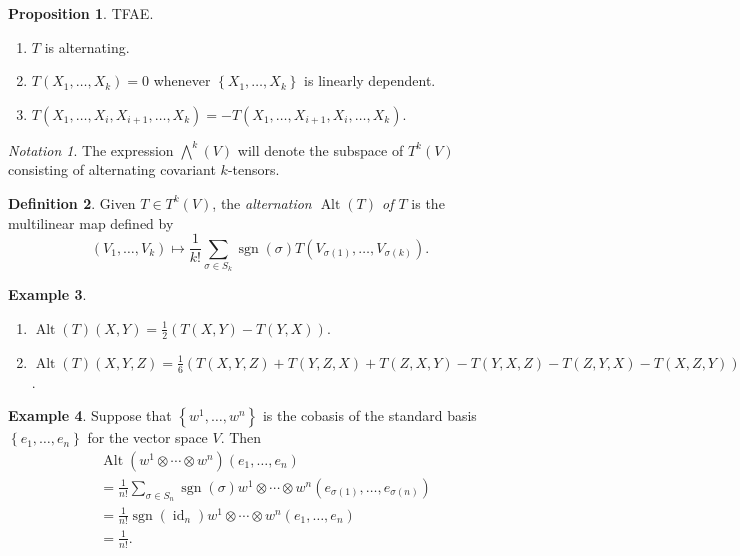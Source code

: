 \documentclass[10pt,letterpaper,cm]{nupset}
\theoremstyle{definition}
\newtheorem{definition}{Definition}[subsection]
\newtheorem{exmp}[definition]{Example}
\theoremstyle{theorem}
\newtheorem{prop}[definition]{Proposition}
\theoremstyle{remark}
\newtheorem*{notation}{Notation}
\newcommand{\1}{\mathbf{1}}
\newcommand{\0}{\vec 0}
\DeclareMathOperator{\id}{id}
\DeclareMathOperator{\Alt}{Alt}
\DeclareMathOperator{\sgn}{sgn}
\begin{document}
\begin{prop} TFAE.
\begin{enumerate}
\item $T$ is alternating.
\item $T(X_1, \ldots, X_k) =0$ whenever $\left\{X_1, \ldots,  X_k\right\}$ is linearly dependent.
\item $T(X_1, \ldots, X_i, X_{i+1}, \ldots, X_k) = {-T(X_1, \ldots, X_{i+1}, X_{i}, \ldots, X_k)}$.
\end{enumerate}
\end{prop}

\begin{notation}
The  expression $\bigwedge^k(V)$ will denote the subspace of $T^k(V)$ consisting of alternating covariant $k$-tensors. 
\end{notation}

\begin{definition}
Given $T\in T^k(V)$, the \textit{alternation $\Alt(T)$ of $T$} is the multilinear map defined by $$ \left(V_1, \ldots, V_k\right) \mapsto \frac{1}{k!} \sum_{\sigma \in S_k} \sgn(\sigma) T\left(V_{\sigma(1)}, \ldots, V_{\sigma(k)}\right).$$
\end{definition}

\begin{exmp}\label{spec} $ $
\begin{enumerate}
\item $\Alt(T)(X,Y) = \frac{1}{2}\left(T(X,Y) - T(Y,X)\right)$.
\item  $\Alt(T)(X, Y, Z) = \frac{1}{6}\left(T(X, Y, Z) + T(Y, Z, X) + T(Z, X, Y)  -T(Y, X, Z)- T(Z, Y, X) -T(X, Z, Y)\right)$.
\end{enumerate}
\end{exmp}

\begin{exmp}\label{fact}
Suppose that $\left\{w^1, \ldots, w^n\right\}$ is the cobasis of the standard basis $ \left\{e_1, \ldots, e_n\right\}$ for the vector space $V$. Then
\begin{align*}
& \Alt(w^1 \otimes \cdots \otimes w^n)(e_1, \ldots, e_n)\\ & = \frac{1}{n!} \sum_{\sigma \in S_n} \sgn(\sigma)w^1 \otimes \cdots \otimes w^n\left(e_{\sigma(1)}, \ldots, e_{\sigma(n)}\right) \\ & =  \frac{1}{n!} \sgn\left(\id_n\right) w^1 \otimes \cdots \otimes w^n\left(e_{1}, \ldots, e_{n}\right) 
\\ & = \frac{1}{n!}.
\end{align*}
\end{exmp}
\end{document}

